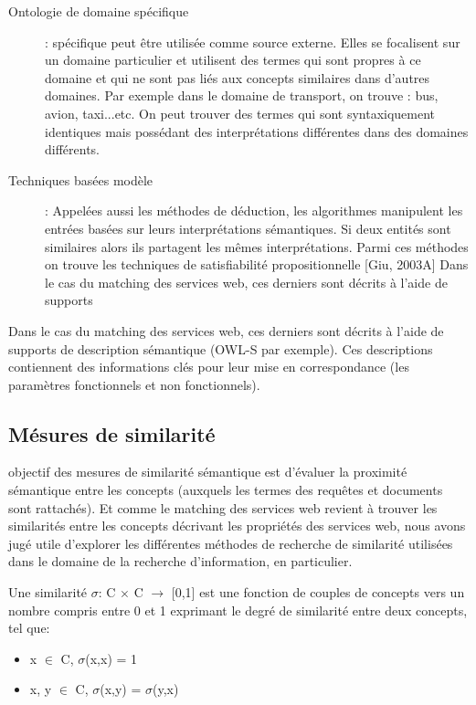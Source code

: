     \SpecialItem
    \begin{description}
    \item [Ontologie de domaine spécifique]: spécifique peut être
      utilisée comme source externe. Elles se focalisent sur un
      domaine particulier et utilisent des termes qui sont propres à
      ce domaine et qui ne sont pas liés aux concepts similaires dans
      d’autres domaines. Par exemple dans le domaine de transport, on
      trouve : bus, avion, taxi...etc. On peut trouver des termes qui
      sont syntaxiquement identiques mais possédant des
      interprétations différentes dans des domaines différents.

    \item [Techniques basées modèle]: Appelées aussi les méthodes de
      déduction, les algorithmes manipulent les entrées basées sur
      leurs interprétations sémantiques. Si deux entités sont
      similaires alors ils partagent les mêmes interprétations. Parmi
      ces méthodes on trouve les techniques de satisfiabilité
      propositionnelle [Giu, 2003A] Dans le cas du matching des
      services web, ces derniers sont décrits à l’aide de supports
    \end{description}

    Dans le cas du matching des services web, ces derniers sont décrits
    à l'aide de supports de description sémantique (OWL-S par
    exemple). Ces descriptions contiennent des informations clés pour
    leur mise en correspondance (les paramètres fonctionnels et non
    fonctionnels).

  \subsection{Mésures de similarité}
  \label{sec:mesure-de-similarire}
  objectif des mesures de similarité sémantique est d'évaluer la
  proximité sémantique entre les concepts (auxquels les termes des
  requêtes et documents sont rattachés). Et comme le matching des
  services web revient à trouver les similarités entre les concepts
  décrivant les propriétés des services web, nous avons jugé utile
  d’explorer les différentes méthodes de recherche de similarité
  utilisées dans le domaine de la recherche d’information, en
  particulier.

  \begin{mydef}
    Une similarité $\sigma$: C $\times$ C $\rightarrow$ [0,1] est une
    fonction de couples de concepts vers un nombre compris entre 0 et
    1 exprimant le degré de similarité entre deux concepts, tel que:
    \SpecialItemi
    \begin{itemize}
      \item x $\in$ C, $\sigma$(x,x) = 1
      \item x, y $\in$ C, $\sigma$(x,y) = $\sigma$(y,x)
    \end{itemize}
  \end{mydef}

